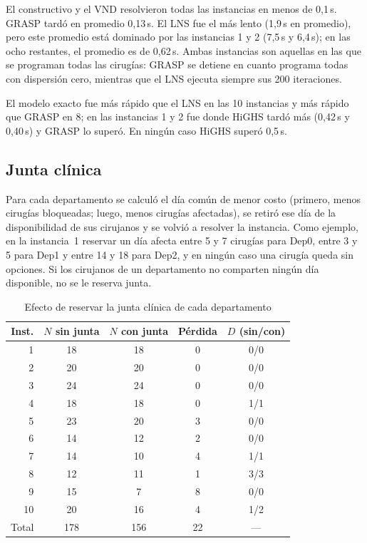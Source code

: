 El constructivo y el VND resolvieron todas las instancias en menos de 0,1\,s. GRASP tardó en promedio 0,13\,s. El LNS fue el más lento (1,9\,s en promedio), pero este promedio está dominado por las instancias 1 y 2 (7,5\,s y 6,4\,s); en las ocho restantes, el promedio es de 0,62\,s. Ambas instancias son aquellas en las que se programan todas las cirugías: GRASP se detiene en cuanto programa todas con dispersión cero, mientras que el LNS ejecuta siempre sus 200 iteraciones.

El modelo exacto fue más rápido que el LNS en las 10 instancias y más rápido que GRASP en 8; en las instancias 1 y 2 fue donde HiGHS tardó más (0,42\,s y 0,40\,s) y GRASP lo superó. En ningún caso HiGHS superó 0,5\,s.

\subsection{Junta clínica}

Para cada departamento se calculó el día común de menor costo (primero, menos cirugías bloqueadas; luego, menos cirugías afectadas), se retiró ese día de la disponibilidad de sus cirujanos y se volvió a resolver la instancia. Como ejemplo, en la instancia~1 reservar un día afecta entre 5 y 7 cirugías para Dep0, entre 3 y 5 para Dep1 y entre 14 y 18 para Dep2, y en ningún caso una cirugía queda sin opciones. Si los cirujanos de un departamento no comparten ningún día disponible, no se le reserva junta.

\begin{table}[t]
	\caption{Efecto de reservar la junta clínica de cada departamento}
	\label{tab:junta}
	\centering
	\small
	\begin{tabular}{@{}rcccc@{}}
		\hline
		Inst. & $N$ sin junta & $N$ con junta & Pérdida & $D$ (sin/con) \\
		\hline
		1  & 18 & 18 & 0 & 0/0 \\
		2  & 20 & 20 & 0 & 0/0 \\
		3  & 24 & 24 & 0 & 0/0 \\
		4  & 18 & 18 & 0 & 1/1 \\
		5  & 23 & 20 & 3 & 0/0 \\
		6  & 14 & 12 & 2 & 0/0 \\
		7  & 14 & 10 & 4 & 1/1 \\
		8  & 12 & 11 & 1 & 3/3 \\
		9  & 15 & 7  & 8 & 0/0 \\
		10 & 20 & 16 & 4 & 1/2 \\
		\hline
		Total & 178 & 156 & 22 & --- \\
		\hline
	\end{tabular}
\end{table}


